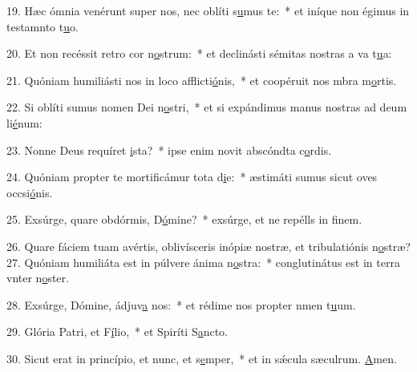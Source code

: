 19. Hæc ómnia venérunt super nos, nec oblíti s\uline{u}mus te:~* et iníque non égimus in testamnto t\uline{u}o.\par 
20. Et non recéssit retro cor n\uline{o}strum:~* et declinásti sémitas nostras a va t\uline{u}a:\par 
21. Quóniam humiliásti nos in loco afflicti\uline{ó}nis,~* et coopéruit nos mbra m\uline{o}rtis.\par 
22. Si oblíti sumus nomen Dei n\uline{o}stri,~* et si expándimus manus nostras ad deum li\uline{é}num:\par 
23. Nonne Deus requíret \uline{i}sta?~* ipse enim novit abscóndta c\uline{o}rdis.\par 
24. Quóniam propter te mortificámur tota d\uline{i}e:~* æstimáti sumus sicut oves occsi\uline{ó}nis.\par 
25. Exsúrge, quare obdórmis, D\uline{ó}mine?~* exsúrge, et ne repélls in f\uline{i}nem.\par 
26. Quare fáciem tuam avértis, oblivísceris inópiæ nostræ, et tribulatiónis n\uline{o}stræ?
27. Quóniam humiliáta est in púlvere ánima n\uline{o}stra:~* conglutinátus est in terra vnter n\uline{o}ster.\par 
28. Exsúrge, Dómine, ádjuv\uline{a} nos:~* et rédime nos propter nmen t\uline{u}um.\par 
29. Glória Patri, et F\uline{í}lio,~* et Spiríti S\uline{a}ncto.\par 
30. Sicut erat in princípio, et nunc, et s\uline{e}mper,~* et in sǽcula sæculrum. \uline{A}men.\par 
